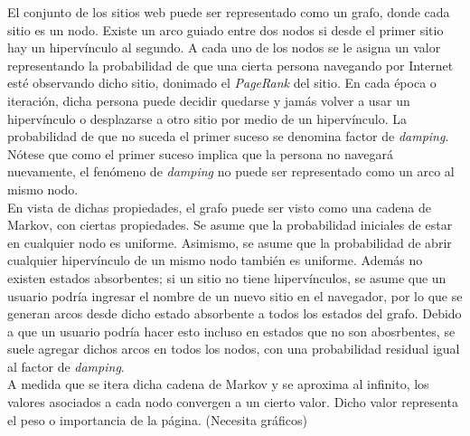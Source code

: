 \documentclass[%
    final,
    reprint,
    notitlepage,
    narroweqnarray,
    inline,
    twoside,
    invited
    ]{ieee}
\begin{document}
\par El conjunto de los sitios web puede ser representado como un grafo, donde cada sitio es un nodo. Existe un arco guiado entre dos nodos si 
desde el primer sitio hay un hipervínculo al segundo. A cada uno de los nodos se le asigna un valor representando la probabilidad de que 
una cierta persona navegando por Internet esté observando dicho sitio, donimado el \textit{PageRank}  del sitio. 
En cada época o iteración, dicha persona puede decidir quedarse y jamás volver 
a usar un hipervínculo o desplazarse a otro sitio por medio de un hipervínculo.  La probabilidad de que no suceda el 
 primer suceso se denomina factor de \textit{damping}. Nótese que como el primer suceso implica que la persona no navegará nuevamente, 
el fenómeno de \textit{damping} no puede ser representado como un arco al mismo nodo.\\
En vista de dichas propiedades, el grafo puede ser visto como una cadena de Markov, con ciertas propiedades. Se asume que la probabilidad iniciales de 
estar en cualquier nodo es uniforme. Asimismo, se asume que la probabilidad de abrir cualquier hipervínculo de un mismo nodo también es uniforme. Además no existen 
estados absorbentes; si un sitio no tiene hipervínculos, se asume que un usuario podría ingresar el nombre de un nuevo sitio en el navegador, por lo que 
se generan arcos desde dicho estado absorbente a todos los estados del grafo. Debido a que un usuario podría hacer esto incluso en estados 
que no son abosrbentes, se suele agregar dichos arcos en todos los nodos, con una probabilidad residual igual al factor de \textit{damping}.\\
A medida que se itera dicha cadena de Markov y se aproxima al infinito, los valores asociados a cada nodo convergen a un cierto valor. Dicho valor 
representa el peso o importancia de la página. (Necesita gráficos)
\end{document}
